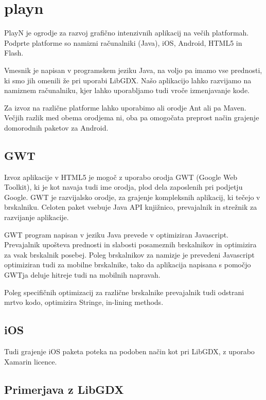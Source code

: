 \section{playn\cite{playn}}

PlayN je ogrodje za razvoj grafično intenzivnih aplikacij na večih platformah. Podprte platforme so namizni računalniki (Java), iOS, Android, HTML5 in Flash.

Vmesnik je napisan v programskem jeziku Java, na voljo pa imamo vse prednosti, ki smo jih omenili že pri uporabi LibGDX. Našo aplikacijo lahko razvijamo na namiznem računalniku, kjer lahko uporabljamo tudi vroče izmenjavanje kode. 

Za izvoz na različne platforme lahko uporabimo ali orodje Ant ali pa Maven. Večjih razlik med obema orodjema ni, oba pa omogočata preprost način grajenje domorodnih paketov za Android.

\subsection{GWT}

Izvoz aplikacije v HTML5 je mogoč z uporabo orodja GWT (Google Web Toolkit), ki je kot navaja tudi ime orodja, plod dela zaposlenih pri podjetju Google. GWT je razvijalsko orodje, za grajenje kompleksnih aplikacij, ki tečejo v brskalniku. Celoten paket vsebuje Java API knjižnico, prevajalnik in strežnik za razvijanje aplikacije.

GWT program napisan v jeziku Java prevede v optimiziran Javascript. Prevajalnik upošteva prednosti in slabosti posameznih brskalnikov in optimizira za vsak brskalnik posebej. Poleg brskalnikov za namizje je prevedeni Javascript optimiziran tudi za mobilne brskalnike, tako da aplikacija napisana s pomočjo GWTja deluje hitreje tudi na mobilnih napravah.

Poleg specifičnih optimizacij za različne brskalnike prevajalnik tudi odstrani mrtvo kodo, optimizira Stringe, in-lining methods.



\subsection{iOS}

Tudi grajenje iOS paketa poteka na podoben način kot pri LibGDX, z uporabo Xamarin licence.

\subsection{Primerjava z LibGDX}

